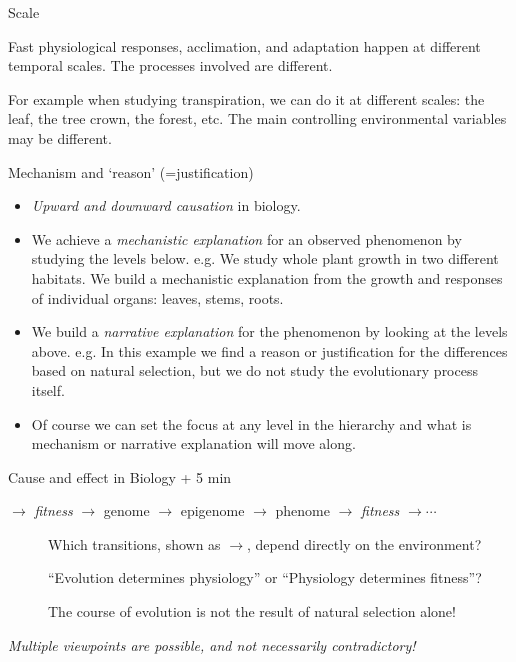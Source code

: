 \documentclass[10pt]{beamer}
\begin{document}
\begin{frame}{Scale}
    \begin{description}[type=1]
        \item[Temporal scale] Fast physiological
        responses, acclimation, and adaptation happen at
        different temporal scales. The processes involved are
        different.
        \item[Spatial scale] For example when
        studying transpiration, we can do it at different
        scales: the leaf, the tree crown, the forest, etc.
        The main controlling environmental variables may
        be different.
    \end{description}
\end{frame}

\begin{frame}{Mechanism and `reason' (=justification)}
    \begin{itemize}
        \item \emph{Upward and downward causation} in biology.
        \item We achieve a \emph{mechanistic explanation} for an
        observed phenomenon by studying the levels below.
        e.g. We study whole plant growth in two different habitats.
        We build a mechanistic
        explanation from the growth and responses of individual
        organs: leaves, stems, roots.

        \item We build a \emph{narrative explanation} for the phenomenon
        by looking at the levels above.
        e.g. In this example we find a reason or justification for
        the differences based on natural selection, but we do not study
        the evolutionary process itself.

        \item Of course we can set the focus at any level in the hierarchy and what is mechanism or narrative explanation will move along.~\DExamples
    \end{itemize}
\end{frame}

\begin{frame}{Cause and effect in Biology  + 5 min}

\begin{centering}
$\to$ \emph{fitness} $\to$ genome $\to$  epigenome $\to$ phenome $\to$ \emph{fitness} $\to \cdots$
\vspace{3ex}
\end{centering}

\begin{description}
  \item[\DiscussionI] Which transitions, shown as $\to$, depend directly on the environment?
  \item[\DiscussionI] ``Evolution determines physiology'' or ``Physiology determines fitness''?
  \item[\Attention] The course of evolution is not the result of natural selection alone!
\end{description}
\pause
\Attention \emph{Multiple viewpoints are possible, and not necessarily contradictory!}
\end{frame}
\end{document}
